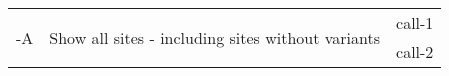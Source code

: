 {\small
\begin{tabular}{@{}p{}p{}l@{}}
\multirow{2}{=}{-A} & \multirow{2}{=}{Show all sites - including sites without variants} & call-1 \\
 &  & call-2 \\
\end{tabular}\\
}
